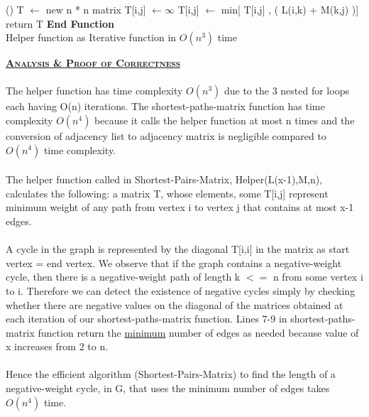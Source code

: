 \documentclass[a4 paper]{article}
\begin{document}
\vspace{4mm}
\begin{algorithm}[H]
\SetAlgoLined
{}
%
\Fn(){\FRecurs}
{
    T $\leftarrow$ new n * n matrix\;
    {   
        {
            T[i,j] $\leftarrow \infty$\;
            {
                T[i,j] $\leftarrow$ min[ T[i,j] , ( L(i,k) + M(k,j) )]
            }
        }
    }
    return T\;
}
\textbf{End Function}\\
\caption{Helper function as Iterative function in $O(n^{3})$ time}
\end{algorithm}
\vspace{4mm}
\textbf{\underline{\textsc{Analysis \& Proof of Correctness}}}\\\\
The helper function has time complexity $O(n^{3})$ due to the 3 nested for loops each having O(n) iterations. The shortest-paths-matrix function has time complexity $O(n^{4})$ because it calls the helper function at most n times and the conversion of adjacency list to adjacency matrix is negligible compared to $O(n^{4})$ time complexity.\\\\
The helper function called in Shortest-Pairs-Matrix, Helper(L(x-1),M,n), calculates the following: a matrix T, whose elements, some T[i,j] represent minimum weight of any path from vertex i to vertex j that contains at most x-1 edges.\\\\ 
A cycle in the graph is represented by the diagonal T[i,i] in the matrix as start vertex = end vertex. We observe that if the graph contains a negative-weight cycle, then there is a negative-weight path of length k $<=$ n from some vertex i to i. Therefore we can detect the existence of negative cycles simply by checking whether there are negative values on the diagonal of the matrices obtained at each iteration of our shortest-paths-matrix function. Lines 7-9 in shortest-paths-matrix function return the \underline{minimum} number of edges as needed because value of x increases from 2 to n.\\\\
Hence the efficient algorithm (Shortest-Pairs-Matrix) to find the length of a negative-weight cycle, in G, that uses the minimum number of edges takes $O(n^{4})$ time.
\end{document}
